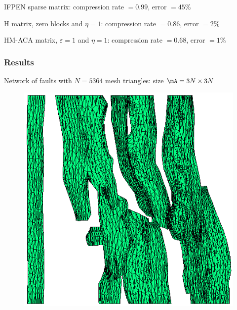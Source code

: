 \begin{frame}
\vspace{-5pt}
{\footnotesize
IFPEN sparse matrix: compression rate $=0.99$, error \alert{$=45\%$}

H matrix, zero blocks and $\eta=1$: compression rate $=0.86$, error $=2\%$

HM-ACA matrix, $\varepsilon=1$ and $\eta=1$: compression rate $=0.68$, error \alert{$=1\%$}
}

\end{frame}


\begin{frame}
\frametitle{Results}

\small

Network of \alert{faults} with $N=5364$ mesh triangles: size $\mA=3N\times 3N$
\vspace{-5pt}
\begin{figure}
\centering
\begin{minipage}[c]{.39\linewidth}
\includegraphics[width=.9\textwidth]{../images/visu_maillage5364FracsTriangles.png}
\end{minipage}
\begin{minipage}[c]{.6\linewidth}

\end{minipage}
\end{figure}
\end{frame}
